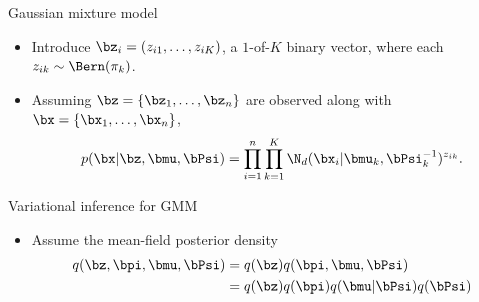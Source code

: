 \begin{frame}{Gaussian mixture model}
  \vspace{2mm}
  \begin{itemize}
    \item Introduce $\bz_i = (z_{i1},\dots,z_{iK})$, a $1$-of-$K$ binary vector, where each $z_{ik} \sim \Bern(\pi_k)$.
    \item Assuming $\bz = \{\bz_1,\dots,\bz_n \}$ are observed along with $\bx = \{\bx_1,\dots,\bx_n \}$,
    \[
      p(\bx|\bz,\bmu,\bPsi) = \prod_{i=1}^n \prod_{k=1}^K \N_d(\bx_i|\bmu_k,\bPsi_k^{-1})^{z_{ik}}.
    \]
  \end{itemize}
\end{frame}

\begin{frame}{Variational inference for GMM}
  \begin{itemize}
    \item Assume the mean-field posterior density
    \begin{align*}
      q(\bz,\bpi,\bmu,\bPsi) &= q(\bz)q(\bpi,\bmu,\bPsi) \\
      &= q(\bz)q(\bpi)q(\bmu|\bPsi)q(\bPsi)
    \end{align*}
  \end{itemize}
  
  \begin{center}
  \end{center}
  
\end{frame}

